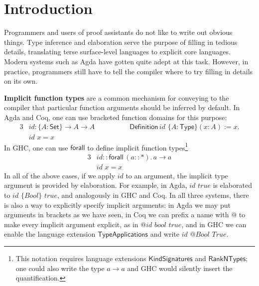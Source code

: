 \documentclass[acmsmall,screen,dvipsnames]{acmart}\settopmatter{}
\newcommand{\kw}[1]{{\mathsf{#1}}}
\newcommand{\mi}[1]{\mathit{#1}}
\theoremstyle{remark}
\begin{document}
\maketitle


\section{Introduction}
\label{sec:introduction}

Programmers and users of proof assistants do not like to write out obvious
things. Type inference and elaboration serve the purpose of filling in tedious
details, translating terse surface-level languages to explicit core
languages. Modern systems such as Agda have gotten quite adept at this
task. However, in practice, programmers still have to tell the compiler where to
try filling in details on its own.

\textbf{Implicit function types} are a common mechanism for conveying to the
compiler that particular function arguments should be inferred by default. In
Agda and Coq, one can use bracketed function domains for this purpose:
\begin{alignat*}{3}
  & \mi{id} : \{A : \kw{Set}\}\to A \to A \hspace{5em} \kw{Definition}\,\mi{id}\,\,\{A : \kw{Type}\}(x : A) := x.\\
  & \mi{id}\,\,x = x
\end{alignat*}
In GHC, one can use $\kw{forall}$ to define implicit function
types\footnote{This notation requires language extensions
  $\mathsf{KindSignatures}$ and $\mathsf{RankNTypes}$; one could also write the type
  $a \to a$ and GHC would silently insert the quantification.}
\begin{alignat*}{3}
  & \mi{id} :: \kw{forall}\,(a :: \kw{*}).\,a \to a\\
  & \mi{id}\,\,x = x
\end{alignat*}
In all of the above cases, if we apply $id$ to an argument, the implicit type
argument is provided by elaboration. For example, in Agda, $\mi{id}\,\,\mi{true}$ is
elaborated to $\mi{id}\,\,\{\mi{Bool}\}\,\,\mi{true}$, and analogously in GHC and Coq. In all three
systems, there is also a way to explicitly specify implicit arguments: in Agda
we may put arguments in brackets as we have seen, in Coq we can prefix a name
with $\kw{@}$ to make every implicit argument explicit, as in
$\kw{@}\mi{id}\,\,\mi{bool}\,\,\mi{true}$, and in GHC we can enable the language extension
$\mathsf{TypeApplications}$ \cite{eisenberg2016visible} and write
$\mi{id}\,\,\kw{@}\mi{Bool}\,\,\mi{True}$.
\end{document}

